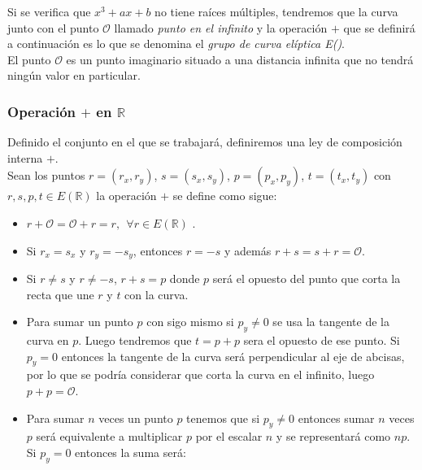 Si se verifica que $x^3+ax+b$ no tiene raíces múltiples, tendremos que la curva junto con 
el punto $\mathcal{O}$ llamado \emph{punto en el infinito} y la operación $+$ que se definirá 
a continuación es lo que se denomina el \emph{grupo de curva elíptica E()}.\\
El punto $\mathcal{O}$ es un punto imaginario situado a una distancia infinita que no tendrá ningún valor en particular.\\

\subsubsection{Operación $+$ en $\mathbb{R}$}
Definido el conjunto en el que se trabajará, definiremos una ley de composición interna $+$.\\
Sean los puntos $r=(r_x,r_y)$, $s=(s_x,s_y)$, $p=(p_x,p_y)$, $t=(t_x,t_y)$ con $r,s,p,t \in E(\mathbb{R})$ la operación $+$ se define como sigue:
\begin{itemize}
	\item $r+\mathcal{O} = \mathcal{O}+r=r,\:\: \forall r \in E(\mathbb{R})$ .
	\item Si $r_x = s_x$ y $r_y = -s_y$, entonces $r=-s$ y además $r+s=s+r=\mathcal{O}$.
	\item Si $r\neq s$ y $r\neq -s$, $r+s=p$ donde $p$ será el opuesto del punto que corta la recta que une $r$ y $t$ con la curva.
	\item Para sumar un punto $p$ con sigo mismo si $p_y\neq0$ se usa la tangente de la curva en $p$. Luego tendremos que $t=p+p$ sera el opuesto de ese punto. Si $p_y=0$ entonces la tangente de la curva será perpendicular al eje de abcisas, por lo que se podría considerar que corta la curva en el infinito, luego $p+p=\mathcal{O}$.
	\item Para sumar $n$ veces un punto $p$ tenemos que si $p_y\neq 0$ entonces sumar $n$ veces $p$ será equivalente a multiplicar $p$ por el escalar $n$ y se representará como $np$. Si $p_y=0$ entonces la suma será:
\end{itemize}
